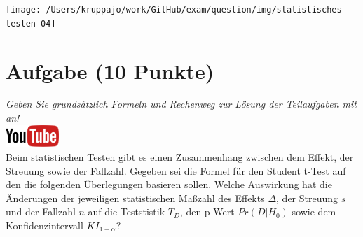 \documentclass[a4paper, 9pt]{scrartcl}\usepackage[]{graphicx}\usepackage[]{xcolor}
\begin{document}
\begin{center}
  \texttt{[image: /Users/kruppajo/work/GitHub/exam/question/img/statistisches-testen-04]}
\end{center}


 
\clearpage

\section{Aufgabe \hfill (10 Punkte)}

\textit{Geben Sie grunds{\"a}tzlich Formeln und Rechenweg zur L{\"o}sung der
  Teilaufgaben mit an!} \\[1Ex]

\hfill\href{https://youtu.be/FgZmpnEWDag}{\includegraphics[width =
  2cm]{img/youtube}}\\[1Ex]



Beim statistischen Testen gibt es einen Zusammenhang zwischen dem Effekt,
der Streuung sowie der Fallzahl. Gegeben sei die Formel f{\"u}r den Student
t-Test auf den die folgenden {\"U}berlegungen basieren sollen. Welche
Auswirkung hat die {\"A}nderungen der jeweiligen statistischen Ma{\ss}zahl des
Effekts $\Delta$, der Streuung $s$ und der Fallzahl $n$ auf die Teststistik
$T_{D}$, den p-Wert $Pr(D|H_0)$ sowie dem Konfidenzintervall
$KI_{1-\alpha}$?
\end{document}
